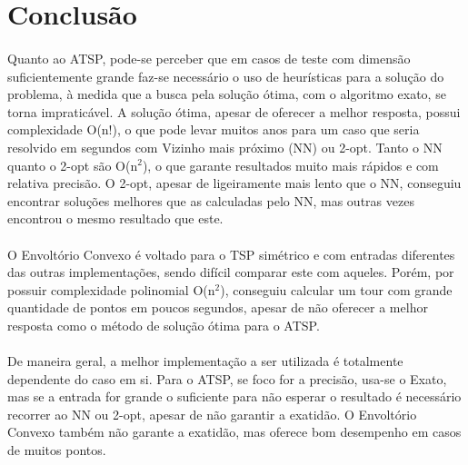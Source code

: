 \documentclass[12pt,a4paper]{article}
\begin{document}
 \section{Conclusão}
  {\paragraph{} Quanto ao ATSP, pode-se perceber que em casos de teste com dimensão suficientemente grande faz-se necessário o uso de heurísticas para a solução do problema, à medida que a busca pela solução ótima, com o algoritmo exato, se torna impraticável. A solução ótima, apesar de oferecer a melhor resposta, possui complexidade O(n!), o que pode levar muitos anos para um caso que seria resolvido em segundos com Vizinho mais próximo (NN) ou 2-opt. Tanto o NN quanto o 2-opt são O(n$^2$), o que garante resultados muito mais rápidos e com relativa precisão. O 2-opt, apesar de ligeiramente mais lento que o NN, conseguiu encontrar soluções melhores que as calculadas pelo NN, mas outras vezes encontrou o mesmo resultado que este. }
  {\paragraph{} O Envoltório Convexo é voltado para o TSP simétrico e com entradas diferentes das outras implementações, sendo difícil comparar este com aqueles. Porém, por possuir complexidade polinomial O(n$^2$), conseguiu calcular um tour com grande quantidade de pontos em poucos segundos, apesar de não oferecer a melhor resposta como o método de solução ótima para o ATSP.}
  {\paragraph{} De maneira geral, a melhor implementação a ser utilizada é totalmente dependente do caso em si. Para o ATSP, se foco for a precisão, usa-se o Exato, mas se a entrada for grande o suficiente para não esperar o resultado é necessário recorrer ao NN ou 2-opt, apesar de não garantir a exatidão. O Envoltório Convexo também não garante a exatidão, mas oferece bom desempenho em casos de muitos pontos.}
 
\end{document}
